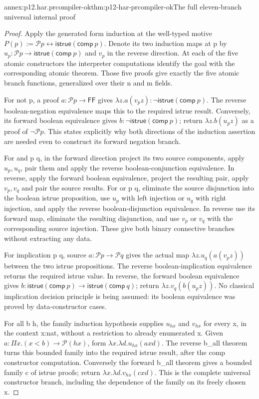 \begin{annexitem}{annex:p12.har.prcompiler-ok}{thm:p12-har-prcompiler-ok}{The full eleven-branch universal internal proof}
\begin{proof}
Apply the generated form induction at the well-typed motive
\(P(p):=\mathcal P p\leftrightarrow
\mathsf{istrue}(\mathsf{comp}\ p)\). Denote its two induction
maps at p by \(u_p:\mathcal P p\to\mathsf{istrue}(\mathsf{comp}\ p)\)
and \(v_p\) in the reverse direction.
At each of the five atomic constructors the interpreter computations
identify the goal with the corresponding atomic theorem. Those five
proofs give exactly the five atomic branch functions, generalized
over their n and m fields.

For not p, a proof \(a:\mathcal P p\to\mathsf{FF}\) gives
\(\lambda z. a(v_p z):\neg\mathsf{istrue}(\mathsf{comp}\ p)\).
The reverse boolean-negation equivalence maps this to the required
istrue result. Conversely, its forward boolean equivalence gives
\(b:\neg\mathsf{istrue}(\mathsf{comp}\ p)\); return
\(\lambda z.b(u_p z)\) as a proof of \(\neg\mathcal P p\).
This states explicitly why both directions of the induction assertion
are needed even to construct its forward negation branch.

For and p q, in the forward direction project its two source
components, apply \(u_p,u_q\), pair them and apply the reverse
boolean-conjunction equivalence. In reverse, apply the forward
boolean equivalence, project the resulting pair, apply \(v_p,v_q\)
and pair the source results. For or p q, eliminate the source
disjunction into the boolean istrue proposition, use \(u_p\) with
left injection or \(u_q\) with right injection, and apply the reverse
boolean-disjunction equivalence. In reverse use its forward map,
eliminate the resulting disjunction, and use \(v_p\) or \(v_q\)
with the corresponding source injection. These give both binary
connective branches without extracting any data.

For implication p q, source \(a:\mathcal P p\to\mathcal P q\)
gives the actual map \(\lambda z.u_q(a(v_p z))\) between the two
istrue propositions. The reverse boolean-implication equivalence
returns the required istrue value. In reverse, the forward boolean
equivalence gives \(b:\mathsf{istrue}(\mathsf{comp}\ p)\to
\mathsf{istrue}(\mathsf{comp}\ q)\); return
\(\lambda z.v_q(b(u_p z))\). No classical implication
decision principle is being assumed: its boolean equivalence was
proved by data-constructor cases.

For all b h, the family induction hypothesis supplies \(u_{h x}\)
and \(v_{h x}\) for every x, in the context x:nat, without a
restriction to already enumerated x. Given
\(a:\Pi x.(x<b)\to\mathcal P(h x)\), form
\(\lambda x.\lambda d.u_{h x}(a x d)\).
The reverse b\_all theorem turns this bounded family into the
required istrue result, after the comp constructor computation.
Conversely the forward b\_all theorem gives a bounded family c of
istrue proofs; return \(\lambda x.\lambda d.v_{h x}(c x d)\).
This is the complete universal constructor branch, including the
dependence of the family on its freely chosen x.


\end{proof}
\end{annexitem}
